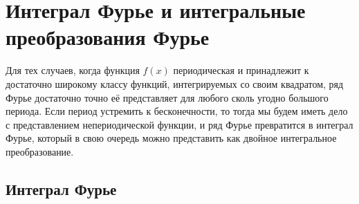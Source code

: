\documentclass[12pt, a4paper]{article}
\begin{document}
\section{Интеграл Фурье и интегральные преобразования Фурье}

Для тех случаев, когда функция $f(x)$ периодическая и принадлежит к достаточно широкому классу функций, интегрируемых со своим квадратом, ряд Фурье достаточно точно её представляет для любого сколь угодно большого периода. Если период устремить к бесконечности, то тогда мы будем иметь дело с представлением непериодической функции, и ряд Фурье превратится в интеграл Фурье, который в свою очередь можно представить как двойное интегральное преобразование.

\subsection{Интеграл Фурье}
\end{document}
